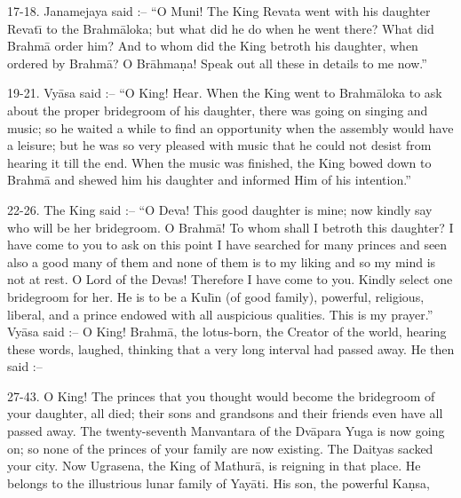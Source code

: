 17-18. Janamejaya said :-- ``O Muni! The King Revata went with his daughter Revat\={\i} to the Brahm\=aloka; but what did he do when he went there? What did Brahm\=a order him? And to whom did the King betroth his daughter, when ordered by Brahm\=a? O Br\=ahma\d{n}a! Speak out all these in details to me now.''

19-21. Vy\=asa said :-- ``O King! Hear. When the King went to Brahm\=aloka to ask about the proper bridegroom of his daughter, there was going on singing and music; so he waited a while to find an opportunity when the assembly would have a leisure; but he was so very pleased with music that he could not desist from hearing it till the end. When the music was finished, the King bowed down to Brahm\=a and shewed him his daughter and informed Him of his intention.''

22-26. The King said :-- ``O Deva! This good daughter is mine; now kindly say who will be her bridegroom. O Brahm\=a! To whom shall I betroth this daughter? I have come to you to ask on this point I have searched for many princes and seen also a good many of them and none of them is to my liking and so my mind is not at rest. O Lord of the Devas! Therefore I have come to you. Kindly select one bridegroom for her. He is to be a Kul\={\i}n (of good family), powerful, religious, liberal, and a prince endowed with all auspicious qualities. This is my prayer.'' Vy\=asa said :-- O King! Brahm\=a, the lotus-born, the Creator of the world, hearing these words, laughed, thinking that a very long interval had passed away. He then said :--

27-43. O King! The princes that you thought would become the bridegroom of your daughter, all died; their sons and grandsons and their friends even have all passed away. The twenty-seventh Manvantara of the Dv\=apara Yuga is now going on; so none of the princes of your family are now existing. The Daityas sacked your city. Now Ugrasena, the King of Mathur\=a, is reigning in that place. He belongs to the illustrious lunar family of Yay\=ati. His son, the powerful Ka\d{n}sa,

